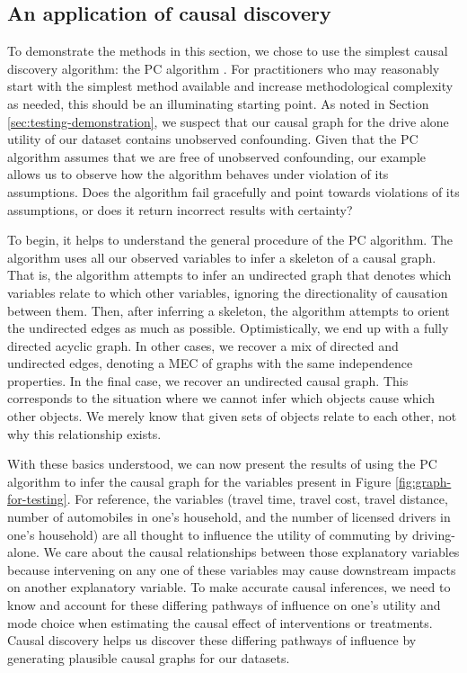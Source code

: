 \subsection{An application of causal discovery}
\label{sec:discovery-application}
To demonstrate the methods in this section, we chose to use the simplest causal discovery algorithm: the PC algorithm \citep{glymour_2001_causation}.
For practitioners who may reasonably start with the simplest method available and increase methodological complexity as needed, this should be an illuminating starting point.
As noted in Section \ref{sec:testing-demonstration}, we suspect that our causal graph for the drive alone utility of our dataset contains unobserved confounding.
Given that the PC algorithm assumes that we are free of unobserved confounding, our example allows us to observe how the algorithm behaves under violation of its assumptions.
Does the algorithm fail gracefully and point towards violations of its assumptions, or does it return incorrect results with certainty?

To begin, it helps to understand the general procedure of the PC algorithm. The algorithm uses all our observed variables to infer a skeleton of a causal graph.
That is, the algorithm attempts to infer an undirected graph that denotes which variables relate to which other variables, ignoring the directionality of causation between them.
Then, after inferring a skeleton, the algorithm attempts to orient the undirected edges as much as possible.
Optimistically, we end up with a fully directed acyclic graph.
In other cases, we recover a mix of directed and undirected edges, denoting a MEC of graphs with the same independence properties.
In the final case, we recover an undirected causal graph.
This corresponds to the situation where we cannot infer which objects cause which other objects.
We merely know that given sets of objects relate to each other, not why this relationship exists.

With these basics understood, we can now present the results of using the PC algorithm to infer the causal graph for the variables present in Figure \ref{fig:graph-for-testing}.
For reference, the variables (travel time, travel cost, travel distance, number of automobiles in one's household, and the number of licensed drivers in one's household) are all thought to influence the utility of commuting by driving-alone.
We care about the causal relationships between those explanatory variables because intervening on any one of these variables may cause downstream impacts on another explanatory variable.
To make accurate causal inferences, we need to know and account for these differing pathways of influence on one's utility and mode choice when estimating the causal effect of interventions or treatments.
Causal discovery helps us discover these differing pathways of influence by generating plausible causal graphs for our datasets.

